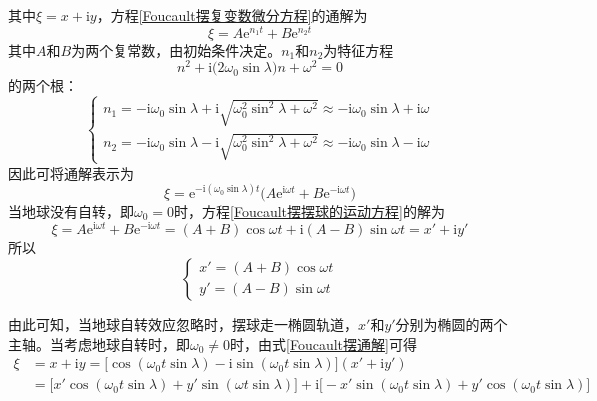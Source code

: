 其中$\xi = x + \mathrm{i}y$，方程\eqref{Foucault摆复变数微分方程}的通解为
\begin{equation*}
	\xi = A\mathrm{e}^{n_1 t} + B\mathrm{e}^{n_2 t}
\end{equation*}
其中$A$和$B$为两个复常数，由初始条件决定。$n_1$和$n_2$为特征方程
\begin{equation*}
	n^2 + \mathrm{i} \big(2\omega_0 \sin \lambda \big) n + \omega^2 = 0
\end{equation*}
的两个根：
\begin{equation*}
\begin{cases}
	n_1 = -\mathrm{i} \omega_0 \sin \lambda + \mathrm{i} \sqrt{\omega_0^2 \sin^2 \lambda + \omega^2} \approx -\mathrm{i} \omega_0 \sin \lambda + \mathrm{i} \omega \\
	n_2 = -\mathrm{i} \omega_0 \sin \lambda - \mathrm{i} \sqrt{\omega_0^2 \sin^2 \lambda + \omega^2} \approx -\mathrm{i} \omega_0 \sin \lambda - \mathrm{i} \omega
\end{cases}
\end{equation*}
因此可将通解表示为
\begin{equation}
	\xi = \mathrm{e}^{-\mathrm{i}(\omega_0\sin \lambda) t} \big(A \mathrm{e}^{\mathrm{i} \omega t} + B \mathrm{e}^{-\mathrm{i} \omega t}\big)
	\label{Foucault摆通解}
\end{equation}
当地球没有自转，即$\omega_0 = 0$时，方程\eqref{Foucault摆摆球的运动方程}的解为
\begin{equation*}
	\xi = A \mathrm{e}^{\mathrm{i} \omega t} + B \mathrm{e}^{-\mathrm{i} \omega t} = (A+B) \cos \omega t + \mathrm{i}(A-B) \sin \omega t = x'+\mathrm{i} y'
\end{equation*}
所以
\begin{equation}
\begin{cases}
	x' = (A+B)\cos \omega t \\
	y' = (A-B)\sin \omega t
\end{cases}
\end{equation}

由此可知，当地球自转效应忽略时，摆球走一椭圆轨道，$x'$和$y'$分别为椭圆的两个主轴。当考虑地球自转时，即$\omega_0 \neq 0$时，由式\eqref{Foucault摆通解}可得
\begin{align*}
	\xi & = x+\mathrm{i} y = \big[\cos(\omega_0 t\sin \lambda)- \mathrm{i} \sin (\omega_0 t\sin \lambda)\big](x'+\mathrm{i} y') \\
	& = \big[x'\cos(\omega_0 t\sin \lambda) + y'\sin(\omega t\sin \lambda)\big] + \mathrm{i} \big[-x'\sin(\omega_0 t\sin \lambda) + y'\cos(\omega_0 t\sin \lambda)\big]
\end{align*}

